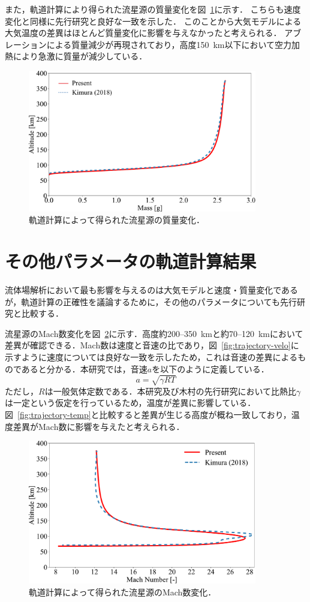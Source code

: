 また，軌道計算により得られた流星源の質量変化を図~\ref{fig:trajectory-mass}に示す．
こちらも速度変化と同様に先行研究と良好な一致を示した．
このことから大気モデルによる大気温度の差異はほとんど質量変化に影響を与えなかったと考えられる．
アブレーションによる質量減少が再現されており，高度150~km以下において空力加熱により急激に質量が減少している．

\begin{figure}[p]
    \centering
    \includegraphics[width=10cm]{fig/trajectory/mass.pdf}
    \caption{軌道計算によって得られた流星源の質量変化．}
    \label{fig:trajectory-mass}
\end{figure}

\section{その他パラメータの軌道計算結果}
流体場解析において最も影響を与えるのは大気モデルと速度・質量変化であるが，軌道計算の正確性を議論するために，その他のパラメータについても先行研究と比較する．

流星源のMach数変化を図~\ref{fig:trajectory-mach}に示す．高度約200--350~kmと約70--120~kmにおいて差異が確認できる．Mach数は速度と音速の比であり，図~\ref{fig:trajectory-velo}に示すように速度については良好な一致を示したため，これは音速の差異によるものであると分かる．本研究では，音速$a$を以下のように定義している．
\begin{equation}
    a = \sqrt{\gamma RT}
\end{equation}
ただし，$R$は一般気体定数である．本研究及び木村の先行研究において比熱比$\gamma$は一定という仮定を行っているため，温度が差異に影響している．図~\ref{fig:trajectory-temp}と比較すると差異が生じる高度が概ね一致しており，温度差異がMach数に影響を与えたと考えられる．
\begin{figure}[p]
    \centering
    \includegraphics[width=10cm]{fig/trajectory/mach.pdf}
    \caption{軌道計算によって得られた流星源のMach数変化．}
    \label{fig:trajectory-mach}
\end{figure}

